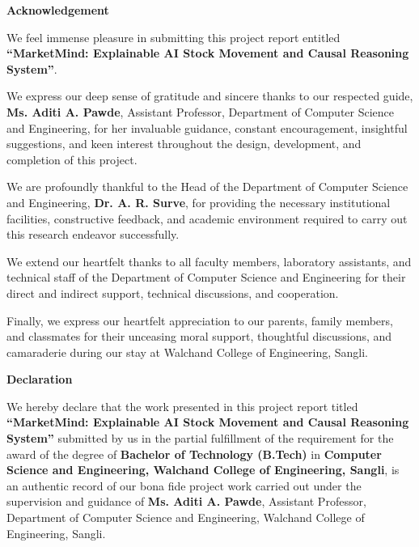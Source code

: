 \documentclass{article}
\begin{document}
	\begin{center}
	\Huge \textbf{\color{blue}Acknowledgement} \\
	\end{center}
	\vspace{1cm}
	{
	\onehalfspacing
	\setlength{\parindent}{2em}
	\setlength{\parskip}{0.8em}

	We feel immense pleasure in submitting this project report entitled \textbf{``MarketMind: Explainable AI Stock Movement and Causal Reasoning System''}.

	We express our deep sense of gratitude and sincere thanks to our respected guide, \textbf{Ms. Aditi A. Pawde}, Assistant Professor, Department of Computer Science and Engineering, for her invaluable guidance, constant encouragement, insightful suggestions, and keen interest throughout the design, development, and completion of this project.

	We are profoundly thankful to the Head of the Department of Computer Science and Engineering, \textbf{Dr. A. R. Surve}, for providing the necessary institutional facilities, constructive feedback, and academic environment required to carry out this research endeavor successfully.

	We extend our heartfelt thanks to all faculty members, laboratory assistants, and technical staff of the Department of Computer Science and Engineering for their direct and indirect support, technical discussions, and cooperation.

	Finally, we express our heartfelt appreciation to our parents, family members, and classmates for their unceasing moral support, thoughtful discussions, and camaraderie during our stay at Walchand College of Engineering, Sangli.

	}
	
	\pagebreak
	\begin{center}
		\Huge \textbf{Declaration} \\
	\end{center}
	\vspace{1cm}
	\par 
	\setlength{\parindent}{8em}
	\doublespacing
    \noindent
	We hereby declare that the work presented in this project report titled 
	\textbf{``MarketMind: Explainable AI Stock Movement and Causal Reasoning System''}
	submitted by us in the partial fulfillment of the requirement for the award of the degree of \textbf{Bachelor of Technology (B.Tech)} in \textbf{Computer Science and Engineering, Walchand College of Engineering, Sangli}, is an authentic record of our bona fide project work carried out under the supervision and guidance of \textbf{Ms. Aditi A. Pawde}, Assistant Professor, Department of Computer Science and Engineering, Walchand College of Engineering, Sangli.
\end{document}
